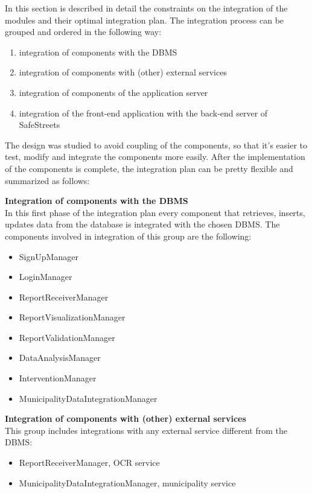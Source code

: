 In this section is described in detail the constraints on the integration of the modules and their optimal integration plan.
The integration process can be grouped and ordered in the following way:
\begin{enumerate}
	\item integration of components with the DBMS
	\item integration of components with (other) external services
	\item integration of components of the application server
	\item integration of the front-end application with the back-end server of SafeStreets
\end{enumerate}


The design was studied to avoid coupling of the components, so that it's easier to test, modify and integrate the components more easily. After the implementation of the components is complete, the integration plan can be pretty flexible and summarized as follows:

\textbf{Integration of components with the DBMS}\\
In this first phase of the integration plan every component that retrieves, inserts, updates data from the database is integrated with the chosen DBMS. The components involved in integration of this group are the following:
\begin{itemize}
	\item SignUpManager
	\item LoginManager
	\item ReportReceiverManager
	\item ReportVisualizationManager
	\item ReportValidationManager
	\item DataAnalysisManager
	\item InterventionManager
	\item MunicipalityDataIntegrationManager
\end{itemize} 

\textbf{Integration of components with (other) external services}\\
This group includes integrations with any external service different from the DBMS:
\begin{itemize}
	\item ReportReceiverManager, OCR service
	\item MunicipalityDataIntegrationManager, municipality service
\end{itemize}

